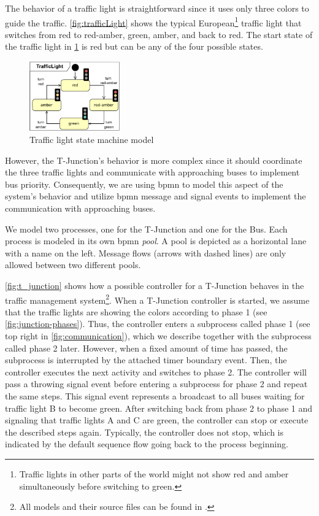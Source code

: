 \documentclass{jot}
\begin{document}
The behavior of a traffic light is straightforward since it uses only three colors to guide the traffic.
\autoref{fig:trafficLight} shows the typical European\footnote{Traffic lights in other parts of the world might not show red and amber simultaneously before switching to green.} traffic light that switches from \textsf{red} to \textsf{red-amber}, \textsf{green}, \textsf{amber}, and back to \textsf{red}.
The start state of the traffic light in \cref{fig:trafficLight} is \textsf{red} but can be any of the four possible states.

\begin{figure}[h]
    \centering
    \includegraphics[width=0.35\textwidth]{figures/trafficLight.pdf}
    \caption{Traffic light state machine model}
    \label{fig:trafficLight}
\end{figure}

However, the T-Junction's behavior is more complex since it should coordinate the three traffic lights and communicate with approaching buses to implement bus priority.
Consequently, we are using \gls*{bpmn} to model this aspect of the system's behavior and utilize \gls*{bpmn} message and signal events to implement the communication with approaching buses.

We model two processes, one for the T-Junction and one for the Bus.
Each process is modeled in its own \gls*{bpmn} \emph{pool}.
A pool is depicted as a horizontal lane with a name on the left.
Message flows (arrows with dashed lines) are only allowed between two different pools.

\autoref{fig:t_junction} shows how a possible controller for a T-Junction behaves in the traffic management system\footnote{All models and their source files can be found in \cite{krauterArtifactsBehavioralConsistency2022}.\label{footnote:fullModels}}.
When a T-Junction controller is started, we assume that the traffic lights are showing the colors according to phase 1 (see \cref{fig:junction-phases}).
Thus, the controller enters a subprocess called phase 1 (see top right in \cref{fig:communication}), which we describe together with the subprocess called phase 2 later.
However, when a fixed amount of time has passed, the subprocess is interrupted by the attached timer boundary event.
Then, the controller executes the next activity and switches to phase 2.
The controller will pass a throwing signal event before entering a subprocess for phase 2 and repeat the same steps.
This signal event represents a broadcast to all buses waiting for traffic light B to become green.
After switching back from phase 2 to phase 1 and signaling that traffic lights A and C are green, the controller can stop or execute the described steps again.
Typically, the controller does not stop, which is indicated by the default sequence flow going back to the process beginning.
\end{document}

